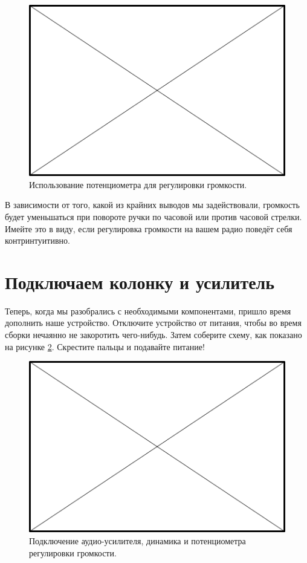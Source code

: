 \begin{figure}
  \centering
  \includegraphics{TODO}
  \caption{Использование потенциометра для регулировки громкости.}
  \label{fig:pot-volume}
\end{figure}

В зависимости от того, какой из крайних выводов мы задействовали, громкость будет уменьшаться при повороте ручки по часовой или против часовой стрелки. Имейте это в виду, если регулировка громкости на вашем радио поведёт себя контринтуитивно.

\section{Подключаем колонку и усилитель}

Теперь, когда мы разобрались с необходимыми компонентами, пришло время дополнить наше устройство. Отключите устройство от питания, чтобы во время сборки нечаянно не закоротить чего-нибудь. Затем соберите схему, как показано на рисунке \ref{fig:amp-pot-speaker-wiring}. Скрестите пальцы и подавайте питание!

\begin{figure}
  \centering
  \includegraphics{TODO}
  \caption{Подключение аудио-усилителя, динамика и потенциометра регулировки громкости.}
  \label{fig:amp-pot-speaker-wiring}
\end{figure}

